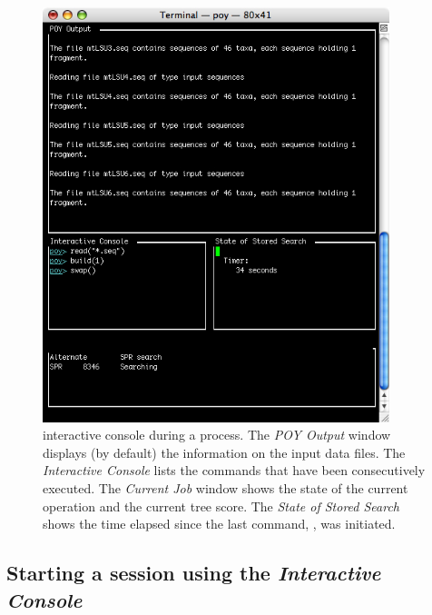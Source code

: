 {\begin{figure}[htbp]
   \centering
   \includegraphics[width=0.9\textwidth]{doc/figures/figprocess.jpg}
   \caption{\poy interactive console during a process. The \emph{POY Output} window displays (by default) the information on the input data files. The \emph{Interactive Console} lists the commands that have been consecutively executed. The \emph{Current Job} window shows the state of the current operation and the current tree score. The \emph{State of Stored Search} shows the time elapsed  since the last command, , was initiated.}
   \label{fig:figprocess}
\end{figure}



\subsection{Starting a \poy session using the \emph{Interactive Console}}

}
